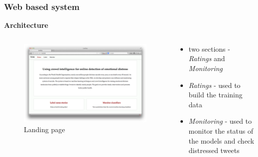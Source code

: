 \documentclass[9pt]{beamer}
\begin{document}
    \begin{frame}
        \frametitle{Web based system}
        \begin{center}
            \textbf{Architecture}
        \end{center}
        \begin{columns}
            \begin{column}{0.5\textwidth}
                \begin{figure}
                    \centering
                    \includegraphics[width=\textwidth]{figures/landing.png}
                    \caption{Landing page}
                \end{figure}
            \end{column}
            \begin{column}{0.5\textwidth}
                \begin{itemize}
                    \item{two sections - \emph{Ratings} and \emph{Monitoring}}
                    \item{\emph{Ratings} - used to build the training data}
                    \item{\emph{Monitoring} - used to monitor the status of the models and check distressed tweets}
                \end{itemize}
            \end{column}
        \end{columns}
    \end{frame}
    
\end{document}
